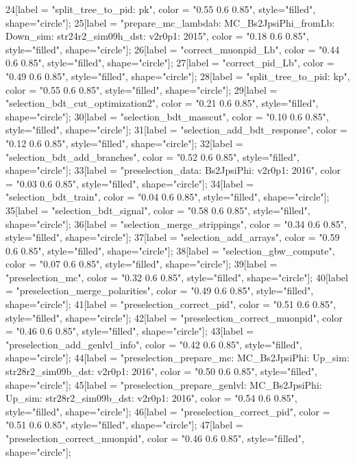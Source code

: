 {	24[label = "split_tree_to_pid\npkkp: pk", color = "0.55 0.6 0.85", style="filled", shape="circle"];
	25[label = "prepare_mc_lambdab\nmode: MC_Bs2JpsiPhi_fromLb\npolarity: Down\nstrip_sim: str24r2_sim09h_dst\nversion: v2r0p1\nyear: 2015", color = "0.18 0.6 0.85", style="filled", shape="circle"];
	26[label = "correct_muonpid_Lb", color = "0.44 0.6 0.85", style="filled", shape="circle"];
	27[label = "correct_pid_Lb", color = "0.49 0.6 0.85", style="filled", shape="circle"];
	28[label = "split_tree_to_pid\npkkp: kp", color = "0.55 0.6 0.85", style="filled", shape="circle"];
	29[label = "selection_bdt_cut_optimization2", color = "0.21 0.6 0.85", style="filled", shape="circle"];
	30[label = "selection_bdt_masscut", color = "0.10 0.6 0.85", style="filled", shape="circle"];
	31[label = "selection_add_bdt_response", color = "0.12 0.6 0.85", style="filled", shape="circle"];
	32[label = "selection_bdt_add_branches", color = "0.52 0.6 0.85", style="filled", shape="circle"];
	33[label = "preselection_data\nmode: Bs2JpsiPhi\nversion: v2r0p1\nyear: 2016", color = "0.03 0.6 0.85", style="filled", shape="circle"];
	34[label = "selection_bdt_train", color = "0.04 0.6 0.85", style="filled", shape="circle"];
	35[label = "selection_bdt_signal", color = "0.58 0.6 0.85", style="filled", shape="circle"];
	36[label = "selection_merge_strippings", color = "0.34 0.6 0.85", style="filled", shape="circle"];
	37[label = "selection_add_arrays", color = "0.59 0.6 0.85", style="filled", shape="circle"];
	38[label = "selection_gbw_compute", color = "0.07 0.6 0.85", style="filled", shape="circle"];
	39[label = "preselection_mc", color = "0.32 0.6 0.85", style="filled", shape="circle"];
	40[label = "preselection_merge_polarities", color = "0.49 0.6 0.85", style="filled", shape="circle"];
	41[label = "preselection_correct_pid", color = "0.51 0.6 0.85", style="filled", shape="circle"];
	42[label = "preselection_correct_muonpid", color = "0.46 0.6 0.85", style="filled", shape="circle"];
	43[label = "preselection_add_genlvl_info", color = "0.42 0.6 0.85", style="filled", shape="circle"];
	44[label = "preselection_prepare_mc\nmode: MC_Bs2JpsiPhi\npolarity: Up\nstrip_sim: str28r2_sim09b_dst\nversion: v2r0p1\nyear: 2016", color = "0.50 0.6 0.85", style="filled", shape="circle"];
	45[label = "preselection_prepare_genlvl\nmode: MC_Bs2JpsiPhi\npolarity: Up\nstrip_sim: str28r2_sim09b_dst\nversion: v2r0p1\nyear: 2016", color = "0.54 0.6 0.85", style="filled", shape="circle"];
	46[label = "preselection_correct_pid", color = "0.51 0.6 0.85", style="filled", shape="circle"];
	47[label = "preselection_correct_muonpid", color = "0.46 0.6 0.85", style="filled", shape="circle"];
}
